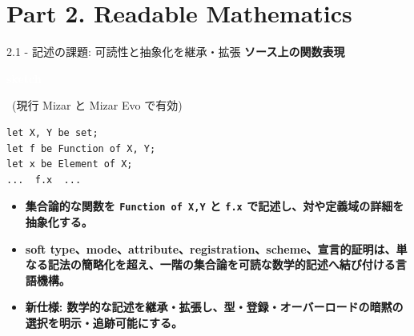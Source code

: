\documentclass[dvipdfmx,aspectratio=169,11pt]{beamer}
\newcommand{\statusbadge}[2]{\colorbox{#1}{\textcolor{white}{\strut\scriptsize\sffamily\bfseries #2}}}
\newcommand{\badgeSketch}{\statusbadge{orange!75!black}{sketch}}
\begin{document}
\section{Part 2. Readable Mathematics}
\begin{frame}[fragile,t]{2.1 - 記述の課題: 可読性と抽象化を継承・拡張}
\smallskip
\textbf{ソース上の関数表現}~\badgeSketch~{\footnotesize(現行 Mizar と Mizar Evo で有効)}
\begin{lstlisting}[language={mizar},basicstyle=\ttfamily\small]
let X, Y be set;
let f be Function of X, Y;
let x be Element of X;
...  f.x  ...
\end{lstlisting}
\begin{itemize}
\setlength{\itemsep}{1pt}
\setlength{\parsep}{0pt}
\setlength{\parskip}{0pt}
\item \textcolor{blue!55!black}{\textbf{集合論的な関数を \texttt{Function of X,Y} と \texttt{f.x} で記述し、対や定義域の詳細を抽象化する。}}
\item \textcolor{blue!55!black}{\textbf{soft type、mode、attribute、registration、scheme、宣言的証明は、単なる記法の簡略化を超え、一階の集合論を可読な数学的記述へ結び付ける言語機構。}}
\item \textcolor{blue!55!black}{\textbf{新仕様: 数学的な記述を継承・拡張し、型・登録・オーバーロードの暗黙の選択を明示・追跡可能にする。}}
\end{itemize}
\end{frame}
\end{document}
